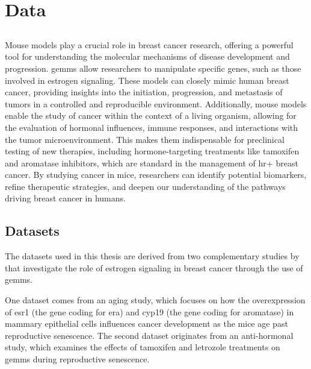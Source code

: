 \section{Data}
\label{sec:data}

\subsection{}
\label{sec:mouse_models}
Mouse models play a crucial role in breast cancer research, offering a powerful
tool for understanding the molecular mechanisms of disease development and
progression.
\Glspl{gemm} allow researchers to manipulate specific genes, such as those
involved in estrogen signaling\supercite{park_mouse_2018}.
These models can closely mimic human breast cancer, providing insights into the
initiation, progression, and metastasis of tumors in a controlled and
reproducible environment\supercite{pfefferle_transcriptomic_2013}.
Additionally, mouse models enable the study of cancer within the context of a
living organism, allowing for the evaluation of hormonal influences, immune
responses, and interactions with the tumor
microenvironment\supercite{manning_mouse_2016}.
This makes them indispensable for preclinical testing of new therapies,
including hormone-targeting treatments like tamoxifen and aromatase inhibitors,
which are standard in the management of \gls{hr+} breast
cancer\supercite{fan_endocrine_2015,yin_disruption_2014}.
By studying cancer in mice, researchers can identify potential biomarkers,
refine therapeutic strategies, and deepen our understanding of the pathways
driving breast cancer in humans\supercite{peterson_amphiregulin_2015}.

\subsection{Datasets}
\label{sec:datasets}
The datasets used in this thesis are derived from two complementary studies by
\textcite{furth_esr1_2023,furth_overexpression_2023} that investigate the role
of estrogen signaling in breast cancer through the use of \glspl{gemm}.

One dataset comes from an aging study, which focuses on how the overexpression
of \gls{esr1} (the gene coding for \gls{era}) and \gls{cyp19} (the gene coding
for aromatase) in mammary epithelial cells influences cancer development as the
mice age past reproductive senescence.
The second dataset originates from an anti-hormonal study, which examines the
effects of tamoxifen and letrozole treatments on \glspl{gemm} during
reproductive senescence.


